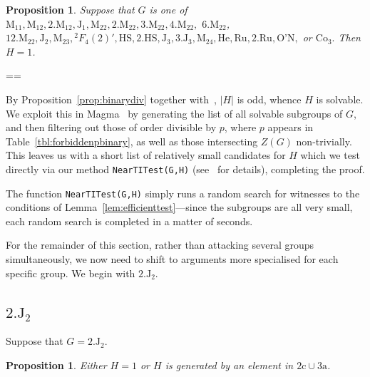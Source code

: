 \documentclass[11pt, a4paper]{amsart}
\makeatletter
\newcommand{\magma}{{\sc Magma}}
\newtheorem{prop}[thm]{Proposition}
\renewcommand{\proofname}{Proof}
\renewenvironment{proof}[1][\proofname]{\par
  \pushQED{\qed}  \normalfont \partopsep=\z@skip \topsep=\z@skip
  \trivlist
  \item[\hskip\labelsep
        \scshape
    #1\@addpunct{.}]\ignorespaces
}{  \popQED\endtrivlist\@endpefalse
}
\makeatother
\begin{document}
  
  
\begin{prop}\label{prop:1stclas}
    Suppose that $G$ is one of $\mathrm{M}_{11}, \mathrm{M}_{12}, 2.\mathrm{M}_{12},\mathrm{J}_1, \mathrm{M}_{22}, 2.\mathrm{M}_{22}, 3.\mathrm{M}_{22}, 
    4.\mathrm{M}_{22},$ $6.\mathrm{M}_{22}$,
    $12.\mathrm{M}_{22},\mathrm{J}_2,\mathrm{M}_{23},{}^2F_4(2)',\mathrm{HS},2.\mathrm{HS},\mathrm{J}_3, 3.\mathrm{J}_3 ,\mathrm{M}_{24},\mathrm{He},\mathrm{Ru},2.\mathrm{Ru},\mathrm{O\text{'}N},$ or $\mathrm{Co}_3.$ Then $H=1$.
\end{prop}
\begin{proof}
    By Proposition~\ref{prop:binarydiv} together with~\cite[Lemma 2.12, Theorem 4.2, and Table 8]{CDP}, $|H|$ is odd, whence $H$ is solvable. We exploit this in \magma~\cite{magma} by generating the list of all solvable subgroups of $G$, and then filtering out those of order divisible by $p$, where $p$ appears in Table~\ref{tbl:forbiddenpbinary}, as well as those intersecting $Z(G)$ non-trivially. This leaves us with a short list of relatively small candidates for $H$ which we test directly via our method {\tt{NearTITest(G,H)}} (see~\cite{comps} for details), completing the proof.
\end{proof}
\begin{rk}
    The function {\tt{NearTITest(G,H)}} simply runs a random search for witnesses to the conditions of Lemma~\ref{lem:efficienttest}---since the subgroups are all very small, each random search is completed in a matter of seconds.
\end{rk}
  


                                                                                                                        
         
                  
                  
         
                  
                           
           

 
          

      
     
       
 
For the remainder of this section, rather than attacking several groups simultaneously, we now need to shift to arguments more specialised for each specific group. We begin with $2.\mathrm{J}_2$.
\subsection{$2.\mathrm{J}_2$} Suppose that $G=2.\mathrm{J}_2$.
\begin{prop}\label{prop:2j2}
    Either $H=1$ or $H$ is generated by an element in $\mathrm{2c}\cup\mathrm{3a}$.
\end{prop}
\end{document}
